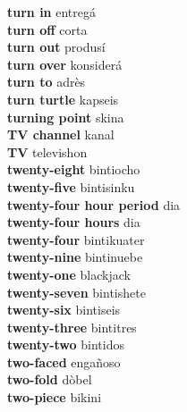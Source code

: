\textbf{ turn in  } entregá \\
\textbf{ turn off  } corta \\
\textbf{ turn out  } produsí \\
\textbf{ turn over  } konsiderá \\
\textbf{ turn to  } adrès \\
\textbf{ turn turtle  } kapseis \\
\textbf{ turning point  } skina \\
\textbf{ TV channel  } kanal \\
\textbf{ TV  } televishon \\
\textbf{ twenty-eight  } bintiocho \\
\textbf{ twenty-five  } bintisinku \\
\textbf{ twenty-four hour period  } dia \\
\textbf{ twenty-four hours  } dia \\
\textbf{ twenty-four  } bintikuater \\
\textbf{ twenty-nine  } bintinuebe \\
\textbf{ twenty-one  } blackjack \\
\textbf{ twenty-seven  } bintishete \\
\textbf{ twenty-six  } bintiseis \\
\textbf{ twenty-three  } bintitres \\
\textbf{ twenty-two  } bintidos \\
\textbf{ two-faced  } engañoso \\
\textbf{ two-fold  } dòbel \\
\textbf{ two-piece  } bikini \\
